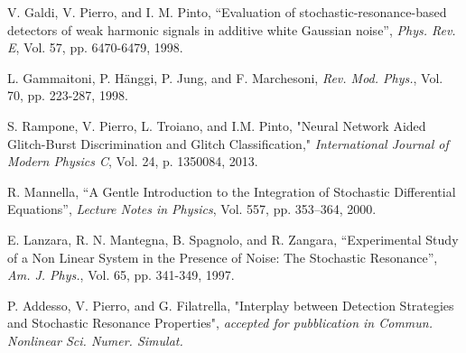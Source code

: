 \documentclass[conference]{IEEEtran}
\begin{document}
\begin{thebibliography}{99}
V. Galdi, V. Pierro, and I. M. Pinto, ``Evaluation of stochastic-resonance-based detectors of weak harmonic signals in additive white Gaussian noise'', {\it Phys. Rev.  E}, Vol.  57, pp. 6470-6479, 1998.

L. Gammaitoni, P. H\"anggi, P. Jung,  and F. Marchesoni, {\it 
Rev. Mod. Phys.}, Vol. {70}, pp. 223-287, 1998.

 S. Rampone, V. Pierro, L. Troiano, and I.M. Pinto,
"Neural Network Aided Glitch-Burst Discrimination and Glitch Classification,"
{\it International Journal of Modern Physics C}, Vol. 24,  p. 1350084, 2013.

  R. Mannella, ``A Gentle Introduction to the Integration of Stochastic Differential Equations'', {\it Lecture Notes in Physics}, Vol. 557, pp. 353--364, 2000.

 E. Lanzara, R. N. Mantegna, B. Spagnolo, and R. Zangara, “Experimental
Study of a Non Linear System in the Presence of Noise: The Stochastic Resonance”, {\it Am. J. Phys.}, Vol. 65, pp.  341-349, 1997.

P. Addesso, V. Pierro, and G. Filatrella, "Interplay between Detection Strategies and Stochastic Resonance Properties", {\it accepted for pubblication in Commun. Nonlinear Sci. Numer. Simulat.} 

\end{thebibliography}
\end{document}
